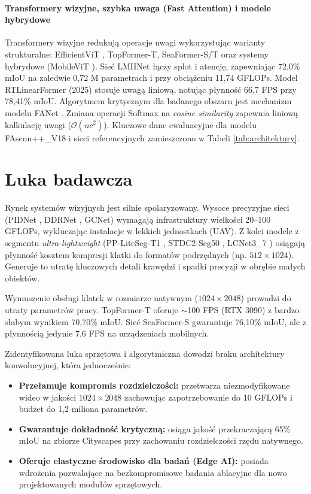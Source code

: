 \paragraph{Transformery wizyjne, szybka uwaga (Fast Attention) i modele hybrydowe}
Transformery wizyjne redukują operacje uwagi wykorzystując warianty strukturalne: EfficientViT , TopFormer-T, SeaFormer-S/T oraz systemy hybrydowe (MobileViT ). Sieć LMIINet łączy splot i atencję, zapewniając 72,0\% mIoU na zaledwie 0,72 M parametrach i przy obciążeniu 11,74 GFLOPs. Model RTLinearFormer (2025) stosuje uwagą liniową, notując płynność 66,7 FPS przy 78,41\% mIoU.
Algorytmem krytycznym dla badanego obszaru jest mechanizm modelu FANet . Zmiana operacji Softmax na \textit{cosine similarity} zapewnia liniową kalkulację uwagi ($\mathcal{O}(nc^2)$). Kluczowe dane ewaluacyjne dla modelu FAscnn++\_V18 i sieci referencyjnych zamieszczono w Tabeli \ref{tab:architektury}.

\section{Luka badawcza}
Rynek systemów wizyjnych jest silnie spolaryzowany. Wysoce precyzyjne sieci (PIDNet , DDRNet , GCNet) wymagają infrastruktury wielkości 20--100 GFLOPs, wykluczając instalacje w lekkich jednostkach (UAV). Z kolei modele z segmentu \textit{ultra-lightweight} (PP-LiteSeg-T1 , STDC2-Seg50 , LCNet3\_7 ) osiągają płynność kosztem kompresji klatki do formatów podrzędnych (np. $512 \times 1024$). Generuje to utratę kluczowych detali krawędzi i spadki precyzji w obrębie małych obiektów.

Wymuszenie obsługi klatek w rozmiarze natywnym ($1024 \times 2048$) prowadzi do utraty parametrów pracy. TopFormer-T  oferuje $\sim$100 FPS (RTX 3090) z bardzo słabym wynikiem 70,70\% mIoU. Sieć SeaFormer-S  gwarantuje 76,10\% mIoU, ale z płynnością jedynie 7,6 FPS na urządzeniach mobilnych.

Zidentyfikowana luka sprzętowa i algorytmiczna dowodzi braku architektury konwolucyjnej, która jednocześnie:
\begin{itemize}
    \item \textbf{Przełamuje kompromis rozdzielczości:} przetwarza niezmodyfikowane wideo w jakości $1024 \times 2048$ zachowując zapotrzebowanie do 10 GFLOPs i budżet do 1,2 miliona parametrów.
    \item \textbf{Gwarantuje dokładność krytyczną:} osiąga jakość przekraczającą 65\% mIoU na zbiorze Cityscapes przy zachowaniu rozdzielczości rzędu natywnego.
    \item \textbf{Oferuje elastyczne środowisko dla badań (Edge AI):} posiada wdrożenia pozwalające na bezkompromisowe badania ablacyjne dla nowo projektowanych modułów sprzętowych.
\end{itemize}

